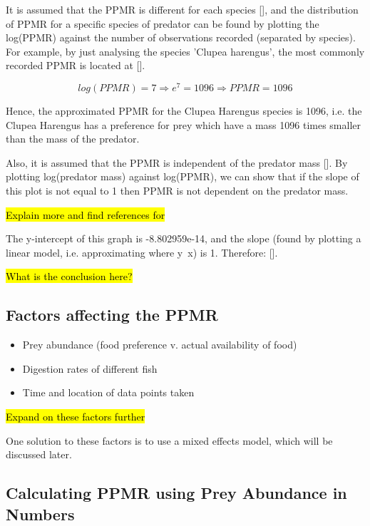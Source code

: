 \documentclass{article}
\begin{document}
It is assumed that the PPMR is different for each species [], and the distribution of PPMR for a specific species of predator can be found by plotting the log(PPMR) against the number of observations recorded (separated by species). For example, by just analysing the species 'Clupea harengus', the most commonly recorded PPMR is located at [].

$$ log(PPMR) = 7 \Rightarrow e^7 = 1096 \Rightarrow PPMR = 1096 $$

Hence, the approximated PPMR for the Clupea Harengus species is 1096, i.e. the Clupea Harengus has a preference for prey which have a mass 1096 times smaller than the mass of the predator.



Also, it is assumed that the PPMR is independent of the predator mass [\cite{tsai2016}]. By plotting log(predator mass) against log(PPMR), we can show that if the slope of this plot is not equal to 1 then PPMR is not dependent on the predator mass.

\hl{Explain more and find references for}



The y-intercept of this graph is -8.802959e-14, and the slope (found by plotting a linear model, i.e. approximating where y~x) is 1. Therefore: [].

\hl{What is the conclusion here?}

\subsection{Factors affecting the PPMR}

\begin{itemize}
    \item Prey abundance (food preference v. actual availability of food)
    \item Digestion rates of different fish
    \item Time and location of data points taken
\end{itemize}

\hl{Expand on these factors further}

One solution to these factors is to use a mixed effects model, which will be discussed later.

\subsection{Calculating PPMR using Prey Abundance in Numbers} \label{1.4}
\end{document}
